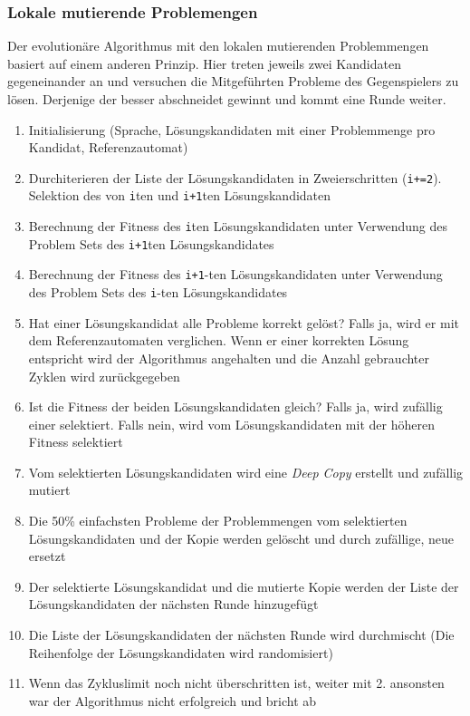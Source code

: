 \subsubsection{Lokale mutierende Problemengen}
\label{subsec:LocalEvolvingProblemSet}
Der evolutionäre Algorithmus mit den lokalen mutierenden Problemmengen basiert auf einem anderen Prinzip. Hier treten jeweils zwei Kandidaten gegeneinander an und versuchen die Mitgeführten Probleme des Gegenspielers zu lösen. Derjenige der besser abschneidet gewinnt und kommt eine Runde weiter.

\begin{enumerate}
\item Initialisierung (Sprache, Lösungskandidaten mit einer Problemmenge pro Kandidat, Referenzautomat)
\item Durchiterieren der Liste der Lösungskandidaten in Zweierschritten (\lstinline$i+=2$). Selektion des von \lstinline$i$ten und \lstinline$i+1$ten Lösungskandidaten
\item Berechnung der Fitness des \lstinline$i$ten Lösungskandidaten unter Verwendung des Problem Sets des \lstinline$i+1$ten Lösungskandidates
\item Berechnung der Fitness des \lstinline$i+1$-ten Lösungskandidaten unter Verwendung des Problem Sets des \lstinline$i$-ten Lösungskandidates
\item Hat einer Lösungskandidat alle Probleme korrekt gelöst? Falls ja, wird er mit dem Referenzautomaten verglichen. Wenn er einer korrekten Lösung entspricht wird der Algorithmus angehalten und die Anzahl gebrauchter Zyklen wird zurückgegeben
\item Ist die Fitness der beiden Lösungskandidaten gleich? Falls ja, wird zufällig einer selektiert. Falls nein, wird vom Lösungskandidaten mit der höheren Fitness selektiert
\item Vom selektierten Lösungskandidaten wird eine \textit{Deep Copy} erstellt und zufällig mutiert
\item Die 50\% einfachsten Probleme der Problemmengen vom selektierten Lösungskandidaten und der Kopie werden gelöscht und durch zufällige, neue ersetzt 
\item Der selektierte Lösungskandidat und die mutierte Kopie werden der Liste der Lösungskandidaten der nächsten Runde hinzugefügt
\item Die Liste der Lösungskandidaten der nächsten Runde wird durchmischt (Die Reihenfolge der Lösungskandidaten wird randomisiert)
\item Wenn das Zykluslimit noch nicht überschritten ist, weiter mit 2. ansonsten war der Algorithmus nicht erfolgreich und bricht ab
\end{enumerate}